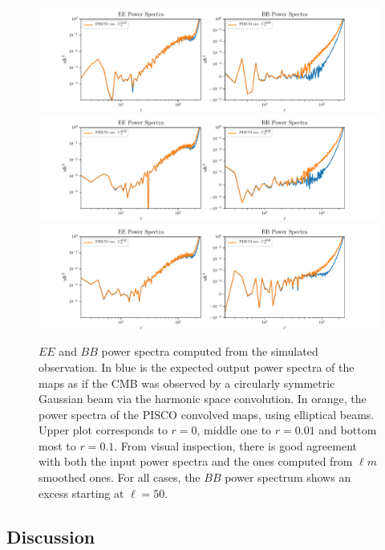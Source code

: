 \documentclass[a4paper,fleqn]{cas-dc}\sloppy
\begin{document}
	\begin{figure}
		\centering
		\includegraphics[width=1.0\linewidth]{figures/CLASS_scan_7_20_elliptical_gussian_beams_r_0d00.pdf}
		\includegraphics[width=1.0\linewidth]{figures/CLASS_scan_7_20_elliptical_gussian_beams_r_0d01.pdf}
		\includegraphics[width=1.0\linewidth]{figures/CLASS_scan_7_20_elliptical_gussian_beams_r_0d10.pdf}
		\caption{$EE$ and $BB$ power spectra computed from the simulated observation. In blue is the expected output power spectra of the maps as if the CMB was observed by a circularly symmetric Gaussian beam via the harmonic space convolution. In orange, the power spectra of the PISCO convolved maps, using elliptical beams. Upper plot corresponds to $r=0$, middle one to $r=0.01$ and bottom most to $r=0.1$. From visual inspection, there is good agreement with both the input power spectra and the ones computed from $\ell m$ smoothed ones. For all cases, the $BB$ power spectrum shows an excess starting at $\ell = 50$.}
		\label{fig::piscoclasssim}
	\end{figure}
	
	\subsection{Discussion}
	
\end{document}
